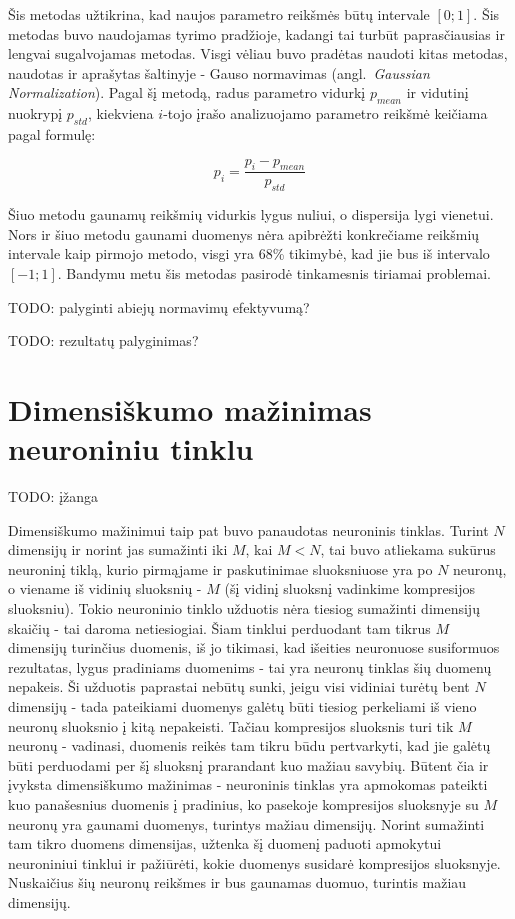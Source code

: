\documentclass{VUMIFPSbakalaurinis}
\newcommand{\TODO}[1]{
\colorbox{todo-background-color}{TODO: #1}
}
\begin{document}
Šis metodas užtikrina, kad naujos parametro reikšmės būtų intervale $[0; 1]$.
Šis metodas buvo naudojamas tyrimo pradžioje, kadangi tai turbūt paprasčiausias ir lengvai sugalvojamas metodas.
Visgi vėliau buvo pradėtas naudoti kitas metodas, naudotas ir aprašytas \cite{gaussian} šaltinyje - Gauso normavimas (angl.~\textit{Gaussian Normalization}).
Pagal šį metodą, radus parametro vidurkį $p_{mean}$ ir vidutinį nuokrypį $p_{std}$, kiekviena $i$-tojo įrašo analizuojamo parametro reikšmė keičiama pagal formulę:

\begin{equation}
p_i = \frac{p_i - p_{mean}}{p_{std}}
\end{equation}

Šiuo metodu gaunamų reikšmių vidurkis lygus nuliui, o dispersija lygi vienetui.
Nors ir šiuo metodu gaunami duomenys nėra apibrėžti konkrečiame reikšmių intervale kaip pirmojo metodo, visgi yra 68\% tikimybė, kad jie bus iš intervalo $[-1; 1]$.
Bandymu metu šis metodas pasirodė tinkamesnis tiriamai problemai.

\TODO{palyginti abiejų normavimų efektyvumą?}

\TODO{rezultatų palyginimas?}



\section{Dimensiškumo mažinimas neuroniniu tinklu}


\TODO{įžanga}

Dimensiškumo mažinimui taip pat buvo panaudotas neuroninis tinklas.
Turint $N$ dimensijų ir norint jas sumažinti iki $M$, kai $M < N$, tai buvo atliekama sukūrus neuroninį tiklą, kurio pirmąjame ir paskutinimae sluoksniuose yra po $N$ neuronų, o viename iš vidinių sluoksnių - $M$ (šį vidinį sluoksnį vadinkime kompresijos sluoksniu).
Tokio neuroninio tinklo užduotis nėra tiesiog sumažinti dimensijų skaičių - tai daroma netiesiogiai.
Šiam tinklui perduodant tam tikrus $M$ dimensijų turinčius duomenis, iš jo tikimasi, kad išeities neuronuose susiformuos rezultatas, lygus pradiniams duomenims - tai yra neuronų tinklas šių duomenų nepakeis.
Ši užduotis paprastai nebūtų sunki, jeigu visi vidiniai turėtų bent $N$ dimensijų - tada pateikiami duomenys galėtų būti tiesiog perkeliami iš vieno neuronų sluoksnio į kitą nepakeisti.
Tačiau kompresijos sluoksnis turi tik $M$ neuronų - vadinasi, duomenis reikės tam tikru būdu pertvarkyti, kad jie galėtų būti perduodami per šį sluoksnį prarandant kuo mažiau savybių.
Būtent čia ir įvyksta dimensiškumo mažinimas - neuroninis tinklas yra apmokomas pateikti kuo panašesnius duomenis į pradinius, ko pasekoje kompresijos sluoksnyje su $M$ neuronų yra gaunami duomenys, turintys mažiau dimensijų.
Norint sumažinti tam tikro duomens dimensijas, užtenka šį duomenį paduoti apmokytui neuroniniui tinklui ir pažiūrėti, kokie duomenys susidarė kompresijos sluoksnyje.
Nuskaičius šių neuronų reikšmes ir bus gaunamas duomuo, turintis mažiau dimensijų.
\end{document}

